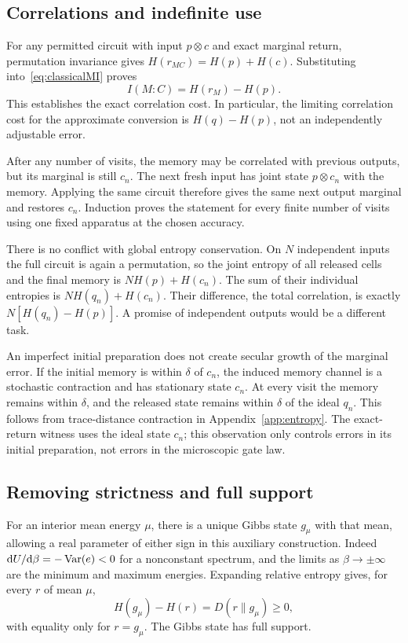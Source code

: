 \subsection{Correlations and indefinite use}
For any permitted circuit with input $p\otimes c$ and exact marginal return, permutation invariance gives $H(r_{MC})=H(p)+H(c)$. Substituting into~\eqref{eq:classicalMI} proves
\begin{equation}
 I(M:C)=H(r_M)-H(p). \label{eq:correlationcost}
\end{equation}
This establishes the exact correlation cost. In particular, the limiting correlation cost for the approximate conversion is $H(q)-H(p)$, not an independently adjustable error.

After any number of visits, the memory may be correlated with previous outputs, but its marginal is still $c_n$. The next fresh input has joint state $p\otimes c_n$ with the memory. Applying the same circuit therefore gives the same next output marginal and restores $c_n$. Induction proves the statement for every finite number of visits using one fixed apparatus at the chosen accuracy.

There is no conflict with global entropy conservation. On $N$ independent inputs the full circuit is again a permutation, so the joint entropy of all released cells and the final memory is $NH(p)+H(c_n)$. The sum of their individual entropies is $NH(q_n)+H(c_n)$. Their difference, the total correlation, is exactly $N[H(q_n)-H(p)]$. A promise of independent outputs would be a different task.

An imperfect initial preparation does not create secular growth of the marginal error. If the initial memory is within $\delta$ of $c_n$, the induced memory channel is a stochastic contraction and has stationary state $c_n$. At every visit the memory remains within $\delta$, and the released state remains within $\delta$ of the ideal $q_n$. This follows from trace-distance contraction in Appendix~\ref{app:entropy}. The exact-return witness uses the ideal state $c_n$; this observation only controls errors in its initial preparation, not errors in the microscopic gate law.

\subsection{Removing strictness and full support}
For an interior mean energy $\mu$, there is a unique Gibbs state $g_\mu$ with that mean, allowing a real parameter of either sign in this auxiliary construction. Indeed $\mathrm{d} U/\mathrm{d}\beta=-\operatorname{Var}(e)<0$ for a nonconstant spectrum, and the limits as $\beta\to\pm\infty$ are the minimum and maximum energies. Expanding relative entropy gives, for every $r$ of mean $\mu$,
\begin{equation}
 H(g_\mu)-H(r)=D(r\|g_\mu)\ge0, \label{eq:classicalgibbs}
\end{equation}
with equality only for $r=g_\mu$. The Gibbs state has full support.

